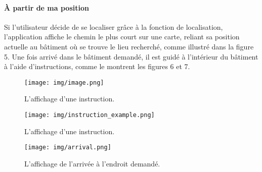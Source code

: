 \documentclass[journal, a4paper]{IEEEtran}
\begin{document}
 \paragraph{À partir de ma position}

Si l'utilisateur décide de se localiser grâce à la fonction de localisation, l'application affiche le chemin le plus court sur une carte, reliant sa position actuelle au bâtiment où se trouve le lieu recherché, comme illustré dans la figure 5. Une fois arrivé dans le bâtiment demandé, il est guidé à l'intérieur du bâtiment à l'aide d'instructions, comme le montrent les figures 6 et 7.
         \begin{figure}[h]
		\begin{center}
		\texttt{[image: img/image.png]}
		\caption{L'affichage d'une instruction.}
		\label{fig:tf_plot}
		\end{center}
	\end{figure}
        \begin{figure}[h]
		\begin{center}
		\texttt{[image: img/instruction\_example.png]}
		\caption{L'affichage d'une instruction.}
		\label{fig:tf_plot}
		\end{center}
	\end{figure}
         \begin{figure}[!h]
		\texttt{[image: img/arrival.png]}
		\caption{L'affichage de l'arrivée à l'endroit demandé.}
		\label{fig:tf_plot}
	\end{figure}
\end{document}
